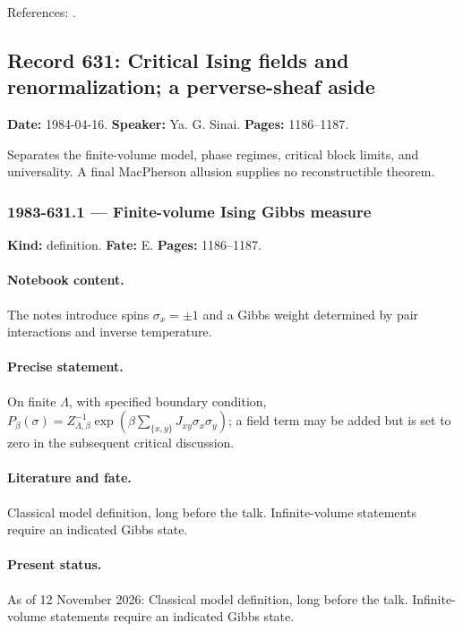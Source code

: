 \noindent References: \citep{beilinson1986absolute,bunkenikolaustamme2018regulator}.\par

\subsection{Record 631: Critical Ising fields and renormalization; a perverse-sheaf aside}

\label{talk:631}

\noindent\textbf{Date:} 1984-04-16. \textbf{Speaker:} Ya. G. Sinai. \textbf{Pages:} 1186--1187.\par

Separates the finite-volume model, phase regimes, critical block limits, and universality. A final MacPherson allusion supplies no reconstructible theorem.

\subsubsection{1983-631.1 --- Finite-volume Ising Gibbs measure}

\label{item:1983-631.1}

\noindent\textbf{Kind:} definition. \textbf{Fate:} E. \textbf{Pages:} 1186--1187.\par

\paragraph{Notebook content.} The notes introduce spins \(\sigma_x=\pm1\) and a Gibbs weight determined by pair interactions and inverse temperature.

\paragraph{Precise statement.} On finite \(\Lambda\), with specified boundary condition, \(P_\beta(\sigma)=Z_{\Lambda,\beta}^{-1}\exp(\beta\sum_{\{x,y\}}J_{xy}\sigma_x\sigma_y)\); a field term may be added but is set to zero in the subsequent critical discussion.

\paragraph{Literature and fate.} Classical model definition, long before the talk. Infinite-volume statements require an indicated Gibbs state.

\paragraph{Present status.} As of 12 November 2026: Classical model definition, long before the talk. Infinite-volume statements require an indicated Gibbs state.

